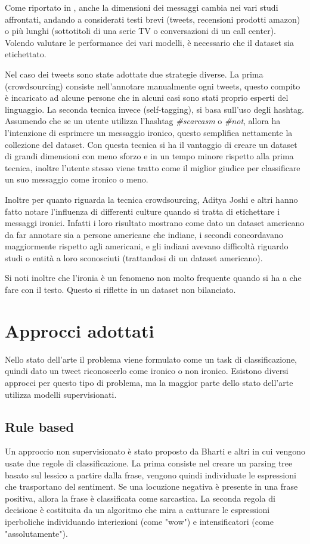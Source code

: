 \documentclass[oneside]{book}
\begin{document}
Come riportato in \cite{survey5}, anche la dimensioni dei messaggi cambia nei vari studi affrontati, andando a considerati testi brevi (tweets, recensioni prodotti amazon) o più lunghi (sottotitoli di una serie TV o conversazioni di un call center). Volendo valutare le performance dei vari modelli, è necessario che il dataset sia etichettato.

Nel caso dei tweets sono state adottate due strategie diverse. La prima (crowdsourcing) consiste nell'annotare manualmente ogni tweets, questo compito è incaricato ad alcune persone che in alcuni casi sono stati proprio esperti del linguaggio. La seconda tecnica invece (self-tagging), si basa sull'uso degli hashtag. Assumendo che se un utente utilizza l'hashtag \textit{\#scarcasm} o \textit{\#not}, allora ha l'intenzione di esprimere un messaggio ironico, questo semplifica nettamente la collezione del dataset. Con questa tecnica si ha il vantaggio di creare un dataset di grandi dimensioni con meno sforzo e in un tempo minore rispetto alla prima tecnica, inoltre l'utente stesso viene tratto come il miglior giudice per classificare un suo messaggio come ironico o meno. 

Inoltre per quanto riguarda la tecnica crowdsourcing, Aditya Joshi e altri \cite{survey5} hanno fatto notare l'influenza di differenti culture quando si tratta di etichettare i messaggi ironici. Infatti i loro risultato mostrano come dato un dataset americano da far annotare sia a persone americane che indiane, i secondi concordavano maggiormente rispetto agli americani, e gli indiani avevano difficoltà riguardo studi o entità a loro sconosciuti (trattandosi di un dataset americano).

Si noti inoltre che l'ironia è un fenomeno non molto frequente quando si ha a che fare con il testo. Questo si riflette in un dataset non bilanciato.


\section{Approcci adottati}
Nello stato dell'arte il problema viene formulato come un task di classificazione, quindi dato un tweet riconoscerlo come ironico o non ironico. Esistono  diversi approcci per questo tipo di problema, ma la maggior parte dello stato dell'arte utilizza modelli supervisionati.

\subsection{Rule based}
Un approccio non supervisionato è stato proposto da Bharti e altri \cite{parsing-tree} in cui vengono usate due regole di classificazione. La prima consiste nel creare un parsing tree basato sul lessico a partire dalla frase, vengono quindi individuate le espressioni che trasportano del sentiment. Se una locuzione negativa è presente in una frase positiva, allora la frase è classificata come sarcastica. La seconda regola di decisione è costituita da un algoritmo che mira a catturare le espressioni iperboliche individuando interiezioni (come "wow") e intensificatori (come "assolutamente").
\end{document}
